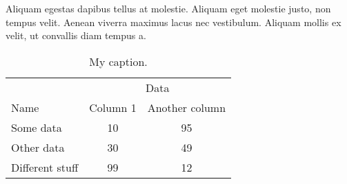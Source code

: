 \documentclass{article}
\begin{document}
Aliquam egestas dapibus tellus at molestie. 
Aliquam eget molestie justo, non tempus velit. 
Aenean viverra maximus lacus nec vestibulum. 
Aliquam mollis ex velit, ut convallis diam tempus a.


\begin{table}
    \centering
	\begin{tabular}{lcc}
		\toprule
		& \multicolumn{2}{c}{Data} \\ \cmidrule(lr){2-3}
		Name & Column 1 & Another column \\
		\midrule
		Some data & 10 & 95 \\
		Other data & 30 & 49 \\
		\addlinespace
		Different stuff & 99 & 12 \\
		\bottomrule
	\end{tabular}
	\caption{My caption.}
	\label{tab-label}
\end{table}
\end{document}
